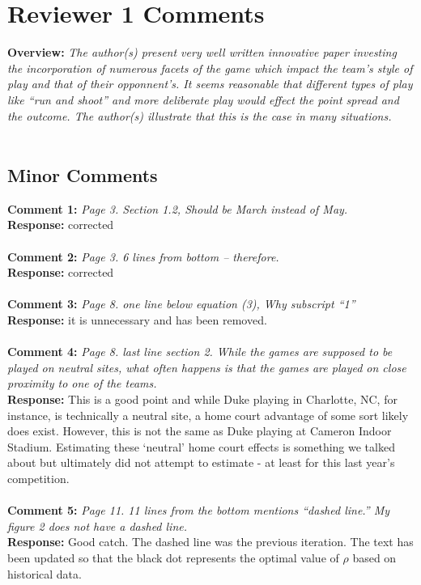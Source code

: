 \documentclass[11pt]{article} %
\begin{document}
\newpage

\section*{Reviewer 1 Comments}
{\bf Overview:} \emph{The author(s) present very well written innovative paper investing the incorporation of numerous facets of the game which impact the team's style of play and that of their opponnent's. It seems reasonable that different types of play like ``run and shoot'' and more deliberate play would effect the point spread and the outcome. The author(s) illustrate that this is the case in many situations.}\\
\\
\subsection*{Minor Comments}
{\bf Comment 1:} \emph{Page 3. Section 1.2, Should be March instead of May.}\\
{\bf Response:} corrected\\
\\
{\bf Comment 2:} \emph{Page 3. 6 lines from bottom -- therefore.}\\
{\bf Response:} corrected\\
\\
{\bf Comment 3:} \emph{Page 8. one line below equation (3), Why subscript ``1''}\\
{\bf Response:} it is unnecessary and has been removed.\\
\\
{\bf Comment 4:} \emph{Page 8. last line section 2. While the games are supposed to be played on neutral sites, what often happens is that the games are played on close proximity to one of the teams.}\\
{\bf Response:} This is a good point and while Duke playing in Charlotte, NC, for instance, is technically a neutral site, a home court advantage of some sort likely does exist. However, this is not the same as Duke playing at Cameron Indoor Stadium. Estimating these `neutral' home court effects is something we talked about but ultimately did not attempt to estimate - at least for this last year's competition.\\
\\
{\bf Comment 5:} \emph{Page 11. 11 lines from the bottom mentions ``dashed line.'' My figure 2 does not have a dashed line.}\\
{\bf Response:} Good catch. The dashed line was the previous iteration. The text has been updated so that the black dot represents the optimal value of $\rho$ based on historical data.\\
\end{document}
